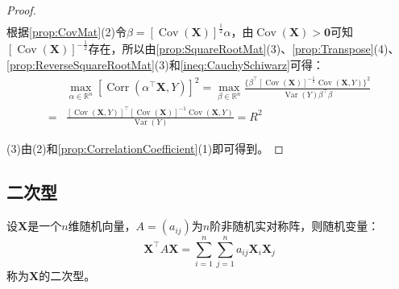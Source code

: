\begin{proof}
\begin{align*}
	\end{align*}
	根据\cref{prop:CovMat}(2)令$\beta=[\operatorname{Cov}(\mathbf{X})]^{\frac{1}{2}}\alpha$，由$\operatorname{Cov}(\mathbf{X})>\mathbf{0}$可知$[\operatorname{Cov}(\mathbf{X})]^{-\frac{1}{2}}$存在，所以由\cref{prop:SquareRootMat}(3)、\cref{prop:Transpose}(4)、\cref{prop:ReverseSquareRootMat}(3)和\cref{ineq:CauchySchiwarz}可得：
	\begin{align*}
		&\max_{\alpha\in\mathbb{R}^{n}}[\operatorname{Corr}(\alpha ^{\top}\mathbf{X},Y)]^2=\max_{\beta\in\mathbb{R}^{n}}\frac{\{\beta^{\top}[\operatorname{Cov}(\mathbf{X})]^{-\frac{1}{2}}\operatorname{Cov}(\mathbf{X},Y)\}^2}{\operatorname{Var}(Y)\beta^{\top}\beta} \\
		=&\frac{[\operatorname{Cov}(\mathbf{X},Y)]^{\top}[\operatorname{Cov}(\mathbf{X})]^{-1}\operatorname{Cov}(\mathbf{X},Y)}{\operatorname{Var}(Y)}=R^2
	\end{align*}\par
	(3)由(2)和\cref{prop:CorrelationCoefficient}(1)即可得到。
\end{proof}

\subsection{二次型}
\begin{definition}
	设$\mathbf{X}$是一个$n$维随机向量，$A=(a_{ij})$为$n$阶非随机实对称阵，则随机变量：
	\begin{equation*}
		\mathbf{X}^{\top}A\mathbf{X}=\sum_{i=1}^{n}\sum_{j=1}^{n}a_{ij}\mathbf{X}_i\mathbf{X}_j
	\end{equation*}
	称为$\mathbf{X}$的二次型。
\end{definition}
